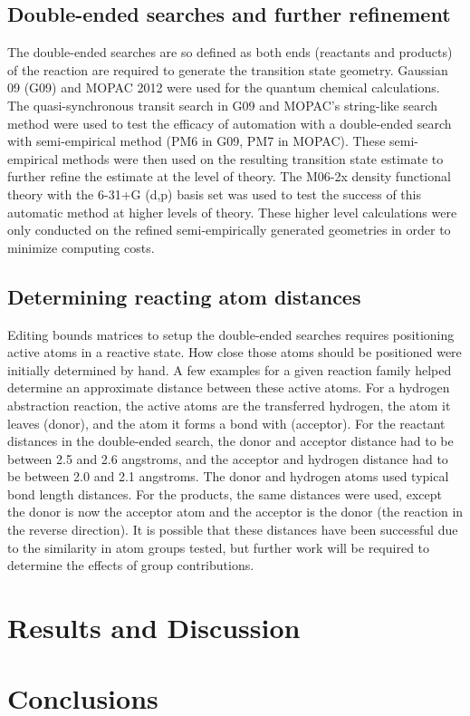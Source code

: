 \documentclass[11pt]{article}
\begin{document}
\subsection{Double-ended searches and further refinement}
The double-ended searches are so defined as both ends (reactants and products) of the reaction are required to generate the transition state geometry. Gaussian 09 (G09) and MOPAC 2012 were used for the quantum chemical calculations. The quasi-synchronous transit search in G09 and MOPAC's string-like search method were used to test the efficacy of automation with a double-ended search with semi-empirical method (PM6 in G09, PM7 in MOPAC). These semi-empirical methods were then used on the resulting transition state estimate to further refine the estimate at the level of theory. The M06-2x density functional theory with the 6-31+G (d,p) basis set was used to test the success of this automatic method at higher levels of theory. These higher level calculations were only conducted on the refined semi-empirically generated geometries in order to minimize computing costs.

\subsection{Determining reacting atom distances}
Editing bounds matrices to setup the double-ended searches requires positioning active atoms in a reactive state. How close those atoms should be positioned were initially determined by hand. A few examples for a given reaction family helped determine an approximate distance between these active atoms. For a hydrogen abstraction reaction, the active atoms are the transferred hydrogen, the atom it leaves (donor), and the atom it forms a bond with (acceptor). For the reactant distances in the double-ended search, the donor and acceptor distance had to be between 2.5 and 2.6 angstroms, and the acceptor and hydrogen distance had to be between 2.0 and 2.1 angstroms. The donor and hydrogen atoms used typical bond length distances. For the products, the same distances were used, except the donor is now the acceptor atom and the acceptor is the donor (the reaction in the reverse direction). It is possible that these distances have been successful due to the similarity in atom groups tested, but further work will be required to determine the effects of group contributions.

\section{Results and Discussion}

\section{Conclusions}
\end{document}
